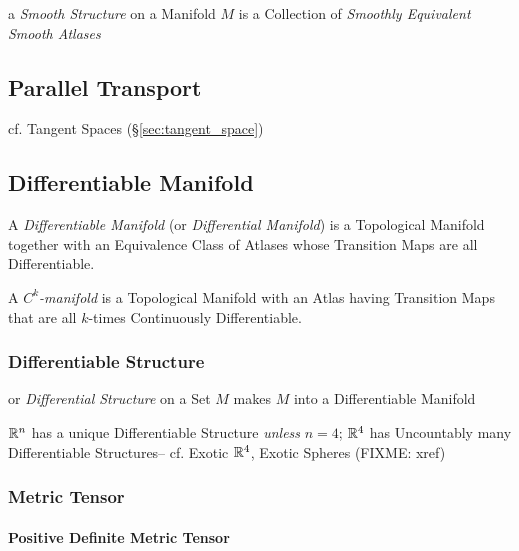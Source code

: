 a \emph{Smooth Structure} on a Manifold $M$ is a Collection of \emph{Smoothly
  Equivalent Smooth Atlases}



\subsection{Parallel Transport}\label{sec:parallel_transport}

\fist cf. Tangent Spaces (\S\ref{sec:tangent_space})



\subsection{Differentiable Manifold}\label{sec:differentiable_manifold}

A \emph{Differentiable Manifold} (or \emph{Differential Manifold}) is a
Topological Manifold together with an Equivalence Class of Atlases whose
Transition Maps are all Differentiable.

A \emph{$C^k$-manifold} is a Topological Manifold with an Atlas having
Transition Maps that are all $k$-times Continuously Differentiable.



\subsubsection{Differentiable Structure}\label{sec:differentiable_structure}

or \emph{Differential Structure} on a Set $M$ makes $M$ into a Differentiable
Manifold

$\mathbb{R}^n$ has a unique Differentiable Structure \emph{unless} $n = 4$;
$\mathbb{R}^4$ has Uncountably many Differentiable Structures-- cf. Exotic
$\mathbb{R}^4$, Exotic Spheres (FIXME: xref)



\subsubsection{Metric Tensor}\label{sec:metric_tensor}

\paragraph{Positive Definite Metric Tensor}
\label{sec:positive_definite_metric_tensor}\hfill

